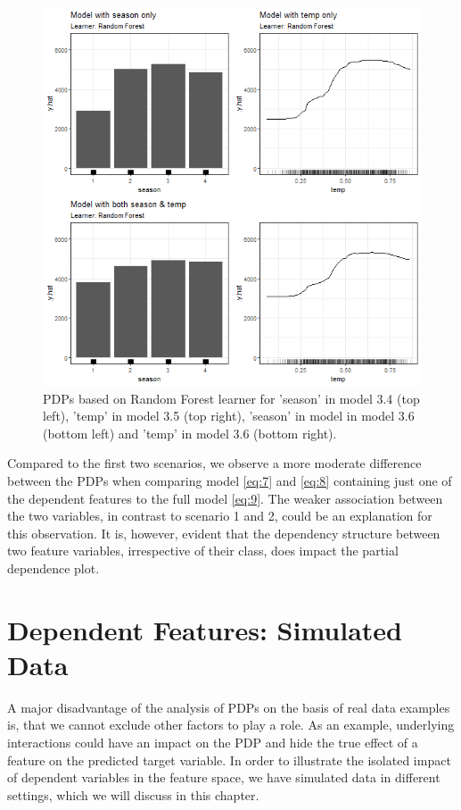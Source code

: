 \documentclass[
]{krantz}
\begin{document}
\begin{figure}

{\centering \includegraphics[width=0.8\linewidth]{images/VK_PDP_13_Correlated_cat_num_RF} 

}

\caption{PDPs based on Random Forest learner for 'season' in model 3.4 (top left), 'temp' in model 3.5 (top right), 'season' in model in model 3.6 (bottom left) and 'temp' in model 3.6 (bottom right).}\label{fig:Figure13}
\end{figure}

Compared to the first two scenarios, we observe a more moderate difference between the PDPs when comparing model \eqref{eq:7} and \eqref{eq:8} containing just one of the dependent features to the full model \eqref{eq:9}. The weaker association between the two variables, in contrast to scenario 1 and 2, could be an explanation for this observation. It is, however, evident that the dependency structure between two feature variables, irrespective of their class, does impact the partial dependence plot.

\hypertarget{SimulatedData}{%
\section{Dependent Features: Simulated Data}\label{SimulatedData}}

A major disadvantage of the analysis of PDPs on the basis of real data examples is, that we cannot exclude other factors to play a role. As an example, underlying interactions could have an impact on the PDP and hide the true effect of a feature on the predicted target variable.\citep{molnar2019} In order to illustrate the isolated impact of dependent variables in the feature space, we have simulated data in different settings, which we will discuss in this chapter.
\end{document}

